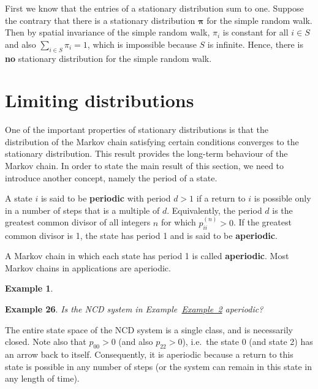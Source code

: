 \documentclass[
]{book}
\theoremstyle{definition}
\theoremstyle{definition}
\newtheorem{example}{Example}[chapter]
\theoremstyle{definition}
\theoremstyle{definition}
\theoremstyle{remark}
\begin{document}
First we know that the entries of a stationary distribution sum to one.
Suppose the contrary that there is a stationary distribution
\(\boldsymbol{\pi}\) for the simple random walk. Then by spatial
invariance of the simple random walk, \(\pi_i\) is constant for all
\(i \in S\) and also \(\sum_{i\in S}\pi_i = 1\), which is impossible because
\(S\) is infinite. Hence, there is \textbf{no} stationary distribution for the
simple random walk.

\hypertarget{limiting-distributions}{%
\section*{Limiting distributions}\label{limiting-distributions}}

One of the important properties of stationary distributions is that the
distribution of the Markov chain satisfying certain conditions converges
to the stationary distribution. This result provides the long-term
behaviour of the Markov chain. In order to state the main result of this
section, we need to introduce another concept, namely the period of a
state.

A state \(i\) is said to be \textbf{periodic} with period \(d > 1\) if a return
to \(i\) is possible only in a number of steps that is a multiple of \(d\).
Equivalently, the period \(d\) is the greatest common divisor of all
integers \(n\) for which \(p^{(n)}_{ii} > 0\). If the greatest common
divisor is 1, the state has period 1 and is said to be \textbf{aperiodic}.

A Markov chain in which each state has period 1 is called \textbf{aperiodic}.
Most Markov chains in applications are aperiodic.

\begin{example}
\protect\hypertarget{exm:unlabeled-div-28}{}\label{exm:unlabeled-div-28}

\textbf{Example 26}. \emph{Is the NCD system in
Example~\protect\hyperlink{NCD}{Example~2}
aperiodic?}

\end{example}

The entire state space of the NCD system is a single class, and is
necessarily closed. Note also that \(p_{00} > 0\) (and also \(p_{22} > 0\)),
i.e.~the state 0 (and state 2) has an arrow back to itself.
Consequently, it is aperiodic because a return to this state is possible
in any number of steps (or the system can remain in this state in any
length of time).
\end{document}
